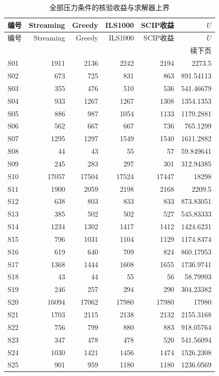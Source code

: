 {\small\setlength{\tabcolsep}{4pt}
\begin{longtable}{lrrrrr}
\caption{全部压力条件的核验收益与求解器上界}\label{tab:stress_objectives}\\
\toprule
编号 & Streaming & Greedy & ILS1000 & SCIP收益 & $U$\\
\midrule
\endfirsthead
\toprule
编号 & Streaming & Greedy & ILS1000 & SCIP收益 & $U$\\
\midrule
\endhead
\midrule
\multicolumn{6}{r}{续下页}\\
\endfoot
\bottomrule
\endlastfoot
S01 & 1911 & 2136 & 2242 & 2194 & 2273.5\\
S02 & 673 & 725 & 831 & 863 & 891.54113\\
S03 & 355 & 476 & 510 & 536 & 541.46679\\
S04 & 933 & 1267 & 1267 & 1308 & 1354.1353\\
S05 & 886 & 987 & 1054 & 1133 & 1170.2881\\
S06 & 562 & 667 & 667 & 736 & 765.1299\\
S07 & 1295 & 1297 & 1549 & 1540 & 1611.2882\\
S08 & 44 & 43 & 55 & 57 & 59.849641\\
S09 & 245 & 283 & 297 & 301 & 312.94385\\
S10 & 17057 & 17504 & 17524 & 17447 & 18298\\
S11 & 1900 & 2059 & 2198 & 2168 & 2209.5\\
S12 & 638 & 803 & 833 & 833 & 873.83051\\
S13 & 385 & 502 & 502 & 527 & 545.83333\\
S14 & 1234 & 1302 & 1417 & 1412 & 1424.6231\\
S15 & 796 & 1031 & 1104 & 1129 & 1174.8374\\
S16 & 619 & 640 & 709 & 824 & 860.17953\\
S17 & 1368 & 1444 & 1608 & 1655 & 1736.9741\\
S18 & 43 & 44 & 55 & 56 & 58.79993\\
S19 & 246 & 257 & 294 & 290 & 304.23382\\
S20 & 16094 & 17062 & 17980 & 17980 & 17980\\
S21 & 1703 & 2115 & 2138 & 2132 & 2155.3168\\
S22 & 756 & 799 & 880 & 883 & 918.05764\\
S23 & 347 & 478 & 478 & 520 & 541.56094\\
S24 & 1030 & 1421 & 1456 & 1474 & 1526.2308\\
S25 & 901 & 959 & 1180 & 1180 & 1236.0569\\

\end{longtable}}
